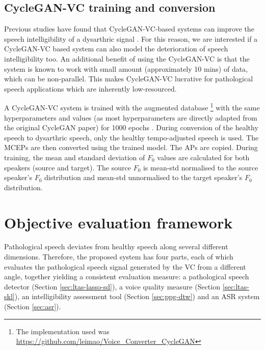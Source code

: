 \documentclass[a4paper]{article}
\begin{document}
\subsection{CycleGAN-VC training and conversion}
\label{sec:acoustic_modeling}


Previous studies have found that CycleGAN-VC-based systems can improve the speech intelligibility of a dysarthric signal \cite{yang2020improving,purohit2020intelligibility}. For this reason, we are interested if a CycleGAN-VC based system can also model the deterioration of speech intelligibility too. An additional benefit of using the CycleGAN-VC is that the system is known to work with small amount (approximately 10 mins) of data, which can be non-parallel. This makes CycleGAN-VC lucrative for pathological speech applications which are inherently low-resourced.


A CycleGAN-VC system is trained with the augmented database \cite{Kaneko2018CycleGANVCNV}\footnote{The implementation used was \url{https://github.com/leimao/Voice_Converter_CycleGAN}} with the same hyperparameters and values  (as most hyperparameters are directly adapted from the original CycleGAN paper) 
for 1000 epochs \cite{zhu2017unpaired}. During conversion of the healthy speech to dysarthric speech, only the healthy tempo-adjusted speech is used. The MCEPs are then converted using the trained model. The APs are copied. During training,  the mean and standard deviation of $F_{0}$ values are calculated for both speakers (source and target). The source $F_0$ is mean-std normalised to the source speaker's $F_0$ distribution and mean-std unnormalised to the target speaker's $F_{0}$ distribution.



\section{Objective evaluation framework}
\label{sec:experiments}

Pathological speech deviates from healthy speech along several different dimensions. Therefore, the proposed system has four parts, each of which evaluates the pathological speech signal generated by the VC from a different angle, together yielding a consistent evaluation measure: a pathological speech detector (Section \ref{sec:ltas-lasso-sd}), a voice quality measure (Section \ref{sec:ltas-skl}), an intelligibility assessment tool (Section \ref{sec:ppg-dtw}) and an ASR system (Section \ref{sec:asr}).
\end{document}
